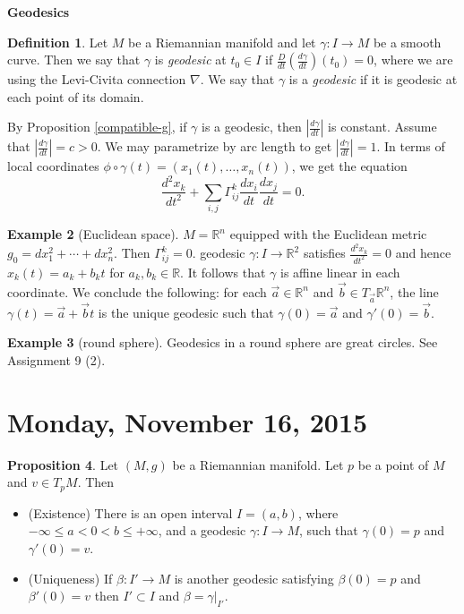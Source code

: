 \documentclass{amsart}
\numberwithin{equation}{section}
\newcommand{\bR}{\mathbb{R}}
\theoremstyle{definition}
\newtheorem{definition}{Definition} [section]
\newtheorem{example}[definition]{Example}
\theoremstyle{theorem}
\newtheorem{proposition}[definition]{Proposition}
\begin{document}
\bigskip

\noindent
{\large \bf Geodesics}

\begin{definition}
Let $M$ be a Riemannian manifold and let $\gamma : I \to M$ be a smooth curve. Then we say that $\gamma$ is {\em geodesic} at $t_0 \in I$ if $\frac{D}{dt}(\frac{d \gamma}{dt})(t_0) = 0$, where we are using the Levi-Civita connection $\nabla$. We say that $\gamma$ is a {\em geodesic} if it is geodesic at each point of its domain.  
\end{definition}



By Proposition \ref{compatible-g}, if $\gamma$ is a geodesic, then $| \frac{d \gamma}{dt}|$ is constant. Assume that $| \frac{d \gamma}{dt}| = c > 0$. We may parametrize by arc length to get $| \frac{d \gamma}{dt}| = 1$. In terms of local coordinates $\phi \circ \gamma(t) = (x_1(t) , \ldots, x_n(t))$, we get the equation 
\[
\frac{d^2 x_k}{d t^2} + \sum_{i,j} \Gamma_{ij}^k \frac{d x_i}{dt} \frac{d x_j}{d t} = 0.
\]

\begin{example}[Euclidean space]
$M=\bR^n$ equipped with the Euclidean metric $g_0=dx_1^2+\cdots + dx_n^2$.
Then  $\Gamma_{ij}^k= 0$. geodesic $\gamma : I \to \mathbb{R}^2$ satisfies $\frac{d^2x_k}{dt^2} = 0$ and hence $x_k(t) = a_k + b_k t$ for $a_k,b_k \in \mathbb{R}$. It follows that $\gamma$ is affine linear in each coordinate. We conclude the following: for each $\vec{a} \in \bR^n$ and 
$\vec{b} \in T_{\vec{a}}\bR^n$, the line $\gamma(t) = \vec{a} + \vec{b}t$ is the 
unique geodesic such that $\gamma(0) = \vec{a}$ and $\gamma'(0) = \vec{b}$. 
\end{example}

\begin{example}[round sphere]
Geodesics in a round sphere are great circles. See Assignment 9 (2).
\end{example}



\section{Monday, November 16, 2015}

\begin{proposition}\label{geodesic-exist}
Let $(M,g)$ be a Riemannian manifold. Let $p$ be a point of $M$ and $v \in T_pM$. Then 
\begin{itemize}
\item (Existence) There is an open interval $I = (a,b)$, where $-\infty\leq a<0<b\leq+\infty$, and a geodesic 
$\gamma :I \to M$, such that $\gamma(0) = p$ and $\gamma'(0) = v$. 
\item (Uniqueness) If $\beta : I' \to M$ is another geodesic satisfying $\beta(0) = p$ and $\beta'(0) =v$ then $I' \subset I$ and 
$\beta = \gamma|_{I'}$. 
\end{itemize}
\end{proposition}
\end{document}
